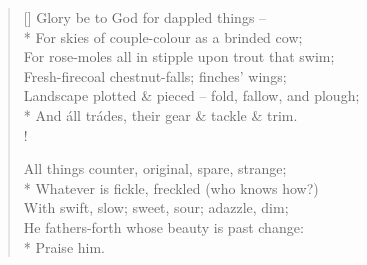 \documentclass[MAIN]{subfiles}
\begin{document}
\settowidth{\versewidth}{Fresh-firecoal chestnut-falls; finches' wings;}
\begin{verse}[\versewidth]
Glory be to God for dappled things --\\*
\vin For skies of couple-colour as a brinded cow;\\
\vin \vin For rose-moles all in stipple upon trout that swim;\\
Fresh-firecoal chestnut-falls; finches' wings;\\
\vin Landscape plotted \& pieced -- fold, fallow, and plough;\\*
\vin \vin And \'all tr\'ades, their gear \& tackle \& trim.\\!

All things counter, original, spare, strange;\\*
\vin Whatever is fickle, freckled (who knows how?)\\
\vin \vin With swift, slow; sweet, sour; adazzle, dim;\\
He fathers-forth whose beauty is past change:\\*
\vin \vin \vin \vin Praise him.
\end{verse}
\end{document}
